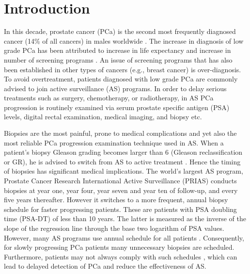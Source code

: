 \section{Introduction}
\label{sec : introduction}
In this decade, prostate cancer (PCa) is the second most frequently diagnosed cancer (14\% of all cancers) in males worldwide \citep{GlobalCancerStats2012}. The increase in diagnosis of low grade PCa has been attributed to increase in life expectancy and increase in number of screening programs \citep{potoskyPSAcancer}. An issue of screening programs that has also been established in other types of cancers (e.g., breast cancer) is over-diagnosis.  To avoid overtreatment, patients diagnosed with low grade PCa are commonly advised to join active surveillance (AS) programs. In order to delay serious treatments such as surgery, chemotherapy, or radiotherapy, in AS PCa progression is routinely examined via serum prostate specific antigen (PSA) levels, digital rectal examination, medical imaging, and biopsy etc.

Biopsies are the most painful, prone to medical complications \citep{loeb2013systematic} and yet also the most reliable PCa progression examination technique used in AS. When a patient's biopsy Gleason grading becomes larger than 6 (Gleason reclassification or GR), he is advised to switch from AS to active treatment \citep{bokhorst2015compliance}. Hence the timing of biopsies has significant medical implications. The world's largest AS program, Prostate Cancer Research International Active Surveillance (PRIAS) conducts biopsies at year one, year four, year seven and year ten of follow-up, and every five years thereafter. However it switches to a more frequent, annual biopsy schedule for faster progressing patients. These are patients with PSA doubling time (PSA-DT) of less than 10 years. The latter is measured as the inverse of the slope of the regression line through the base two logarithm of PSA values. However, many AS programs use annual schedule for all patients \citep{tosoian2011active,welty2015extended}. Consequently, for slowly progressing PCa patients many unnecessary biopsies are scheduled. Furthermore, patients may not always comply with such schedules \citep{bokhorst2015compliance}, which can lead to delayed detection of PCa and reduce the effectiveness of AS.

